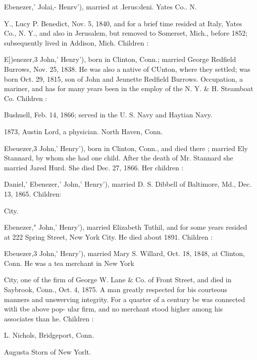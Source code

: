 \documentclass[oneside]{book}
\begin{document}
Ebenezer,' Jolai,- Henrv'), married at .Ierus:deni. Yates Co.. N. 




Y., Lucy P. Benedict, Nov. 5, 1840, and for a brief time resided 
at Italy, Yates Co., N. Y., and also in Jerusalem, but removed 
to Somerset, Mich., before 1852; subsequently lived in Addison, 
Mich. Children : 





E])enezer,3 John,' Henry'), born in Clinton, Conn.; married 
George Redfield Burrows, Nov. 25, 1838. He was also a native 
of CUnton, where they settled; was born Oct. 29, 1815, son of 
John and Jeunette Redfield Burrows. Occupation, a mariner, 
and has for many years been in the employ of the N. Y. \& H. 
Steamboat Co. Children : 


Bushuell, Feb. 14, 1866; served in the U. S. Navy and Haytian 
Navy. 



1873, Austin Lord, a physician. North Haven, Conn. 


Ebeuezer,3 John,' Henry'), born in Clinton, Conn., and died 
there ; married Ely Stannard, by whom she had one child. After 
the death of Mr. Stannard she married Jared Hurd. She died 
Dec. 27, 1866. Her children : 




Daniel,' Ebenezer,' John,' Henry'), married D. S. Dibbell of 
Baltimore, Md., Dec. 13, 1865. Children: 


City. 


Ebenezer," John,' Henry'), married Elizabeth Tuthil, and for 
some years resided at 222 Spring Street, New York City. He 
died about 1891. Children : 




Ebeuezer,3 John,' Henry'), married Mary S. Willard, Oct. 18, 
1848, at Clinton, Conn. He was a tea merchant in New York 




City, one of the firm of George W. Lane \& Co. of Front Street, 
and died in Saybrook, Conn., Oct. 4, 1875. A man greatly 
respected for bis courteous manners and unswerving integrity. 
For a quarter of a century be was connected witli tbe above pop- 
ular firm, and no merchant stood higher among his associates 
than he. Children : 




L. Nichols, Bridgeport, Conn. 

Augusta Storn of New Yorlt. 
\end{document}

